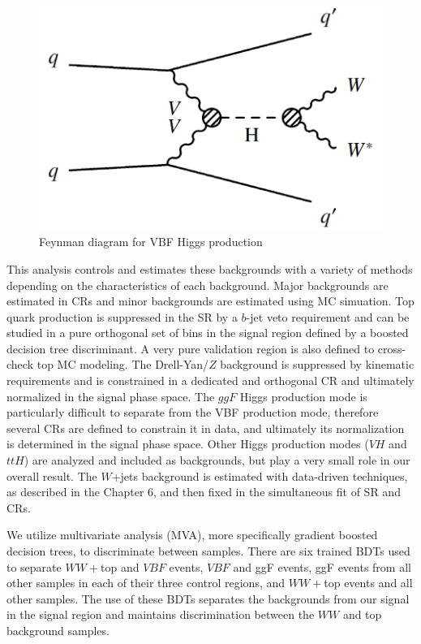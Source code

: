\begin{figure}[!htbp]
    \centering
    \includegraphics[width=0.4\linewidth]{Pictures/fig_01b_2.pdf}
    \caption{Feynman diagram for VBF Higgs production~\cite{Djouadi}}
    \label{fig:FeynmanDiagramVBF}
\end{figure}

This analysis controls and estimates these backgrounds with a variety of methods depending on the characteristics of each background. Major backgrounds are estimated in CRs and minor backgrounds are estimated using MC simuation. Top quark production is suppressed in the SR by a $b$-jet veto requirement and can be studied in a pure orthogonal set of bins in the signal region defined by a boosted decision tree discriminant. A very pure validation region is also defined to cross-check top MC modeling. The Drell-Yan/$Z$ background is suppressed by kinematic requirements and is constrained in a dedicated and orthogonal CR and ultimately normalized in the signal phase space. The $ggF$ Higgs production mode is particularly difficult to separate from the VBF production mode, therefore several CRs are defined to constrain it in data, and ultimately its normalization is determined in the signal phase space. Other Higgs production modes ($VH$ and $ttH$) are analyzed and included as backgrounds, but play a very small role in our overall result. The $W$+jets background is estimated with data-driven techniques, as described in the Chapter 6, and then fixed in the simultaneous fit of SR and CRs.

We utilize multivariate analysis (MVA), more specifically gradient boosted decision trees, to discriminate between samples. There are six trained BDTs used to separate $WW+$top and $VBF$ events, $VBF$ and ggF events, ggF events from all other samples in each of their three control regions, and $WW+$top events and all other samples. The use of these BDTs separates the backgrounds from our signal in the signal region and maintains discrimination between the $WW$ and top background samples. 

